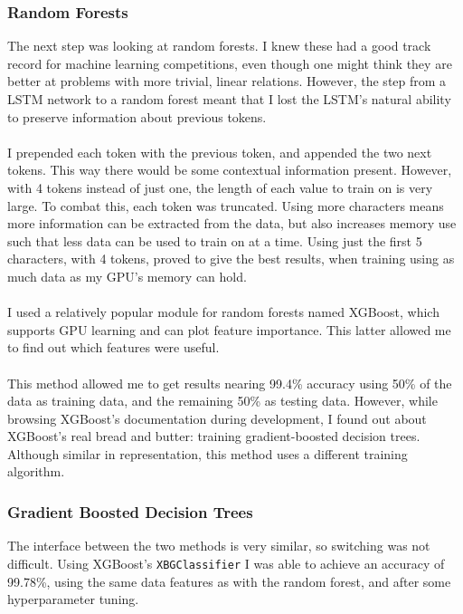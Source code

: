 \documentclass[a4paper, 9pt]{extarticle}
\newcommand{\code}{\texttt}
\begin{document}
\subsubsection{Random Forests}
The next step was looking at random forests. I knew these had a good track record for machine learning competitions, even though one might think they are better at problems with more trivial, linear relations. However, the step from a LSTM network to a random forest meant that I lost the LSTM's natural ability to preserve information about previous tokens.\\
\\
I prepended each token with the previous token, and appended the two next tokens. This way there would be some contextual information present. However, with 4 tokens instead of just one, the length of each value to train on is very large. To combat this, each token was truncated. Using more characters means more information can be extracted from the data, but also increases memory use such that less data can be used to train on at a time. Using just the first 5 characters, with 4 tokens, proved to give the best results, when training using as much data as my GPU's memory can hold.\\
\\
I used a relatively popular module for random forests named XGBoost, which supports GPU learning and can plot feature importance. This latter allowed me to find out which features were useful.\\
\\
This method allowed me to get results nearing 99.4\% accuracy using 50\% of the data as training data, and the remaining 50\% as testing data. However, while browsing XGBoost's documentation during development, I found out about XGBoost's real bread and butter: training gradient-boosted decision trees. Although similar in representation, this method uses a different training algorithm.

\subsubsection{Gradient Boosted Decision Trees}
The interface between the two methods is very similar, so switching was not difficult. Using XGBoost's \code{XBGClassifier} I was able to achieve an accuracy of 99.78\%, using the same data features as with the random forest, and after some hyperparameter tuning.
\end{document}
